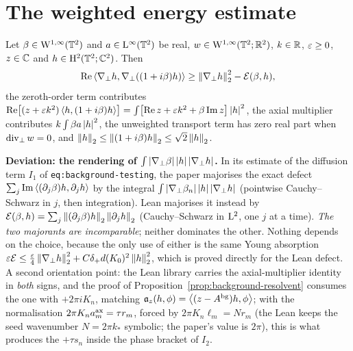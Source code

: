 \section{The weighted energy estimate}

\begin{lemma}
  \label{lem:background:weighted-test}
  \leanok
  Let $\beta\in\mathrm{W}^{1,\infty}(\mathbb{T}^2)$ and $a\in\mathrm{L}^\infty(\mathbb{T}^2)$ be real,
  $w\in\mathrm{W}^{1,\infty}(\mathbb{T}^2;\mathbb{R}^2)$, $k\in\mathbb{R}$, $\varepsilon\geq0$, $z\in\mathbb{C}$ and $h\in\mathrm{H}^2(\mathbb{T}^2;\mathbb{C}^2)$.  Then
  \[
    \operatorname{Re}\left\langle\nabla_\perp h,\nabla_\perp((1+i\beta)h)\right\rangle
      \geq\left\|\nabla_\perp h\right\|_2^2-\mathcal E(\beta,h),
  \]
  the zeroth-order term contributes
  $\operatorname{Re}\bigl[(z+\varepsilon k^2)\left\langle h,(1+i\beta)h\right\rangle\bigr]
   =\int\bigl[\operatorname{Re} z+\varepsilon k^2+\beta\operatorname{Im} z\bigr]\left\lvert h\right\rvert^2$, the axial multiplier contributes
  $k\int\beta a\left\lvert h\right\rvert^2$, the unweighted transport term has zero real part when
  $\operatorname{div}_\perp w=0$, and $\left\|h\right\|_2\leq\left\|(1+i\beta)h\right\|_2\leq\sqrt2\left\|h\right\|_2$.
\end{lemma}

\textbf{Deviation: the rendering of $\int\left\lvert\nabla_\perp\beta\right\rvert\left\lvert h\right\rvert\left\lvert\nabla_\perp h\right\rvert$.}
In its estimate of the diffusion term $I_1$ of \texttt{eq:background-testing}, the paper
majorises the exact defect $\sum_j\operatorname{Im}\left\langle(\partial_j\beta)h,\partial_jh\right\rangle$ by the
integral $\int\left\lvert\nabla_\perp\beta_n\right\rvert\left\lvert h\right\rvert\left\lvert\nabla_\perp h\right\rvert$ (pointwise
Cauchy--Schwarz in $j$, then integration).  Lean majorises it instead by
$\mathcal E(\beta,h)=\sum_j\left\|(\partial_j\beta)h\right\|_2\left\|\partial_jh\right\|_2$
(Cauchy--Schwarz in $\mathrm{L}^2$, one $j$ at a time).  \emph{The two majorants are
incomparable}; neither dominates the other.  Nothing depends on the choice, because the
only use of either is the same Young absorption
$\varepsilon\mathcal E\leq\tfrac{\varepsilon}4\left\|\nabla_\perp h\right\|_2^2+C\delta_+d(K_0)^2\left\|h\right\|_2^2$, which
is proved directly for the Lean defect.  A second orientation point: the Lean library
carries the axial-multiplier identity in \emph{both} signs, and the proof of
Proposition~\ref{prop:background-resolvent} consumes the one with $+2\pi iK_n$, matching
$\mathfrak a_z(h,\phi)=\left\langle(z-A^{\rm bg})h,\phi\right\rangle$; with the normalisation
$2\pi K_na^{\rm ax}_m=\tau r_m$, forced by $2\pi K_n\ell_m=Nr_m$ (the Lean keeps the seed
wavenumber $N=2\pi k_*$ symbolic; the paper's value is $2\pi$), this is what produces the
$+\tau s_n$ inside the phase bracket of $I_2$.

